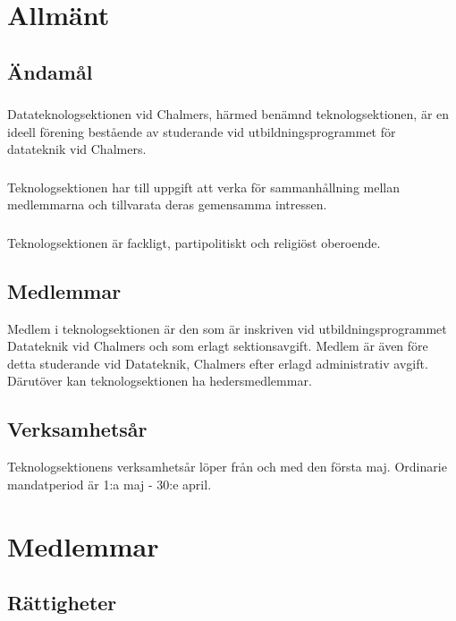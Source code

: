 \documentclass[a4paper, 10pt]{article}
\begin{document}
\newpage
\setcounter{tocdepth}{1}
\tableofcontents
\newpage

\section{Allmänt}
\subsection{Ändamål}
\subsubsection{}
Datateknologsektionen vid Chalmers, härmed benämnd teknologsektionen, är en ideell förening bestående av studerande vid utbildningsprogrammet för datateknik vid Chalmers.
\subsubsection{}
Teknologsektionen har till uppgift att verka för sammanhållning mellan medlemmarna och tillvarata deras gemensamma intressen.
\subsubsection{}
Teknologsektionen är fackligt, partipolitiskt och religiöst oberoende.
\subsection{Medlemmar}
Medlem i teknologsektionen är den som är inskriven vid utbildningsprogrammet Datateknik vid Chalmers och som erlagt sektionsavgift. Medlem är även före detta studerande vid Datateknik, Chalmers efter erlagd administrativ avgift. Därutöver kan teknologsektionen ha hedersmedlemmar.
\subsection{Verksamhetsår}
Teknologsektionens verksamhetsår löper från och med den första maj. Ordinarie mandatperiod är 1:a maj - 30:e april.
\newpage

\section{Medlemmar}
\subsection{Rättigheter}
\end{document}
